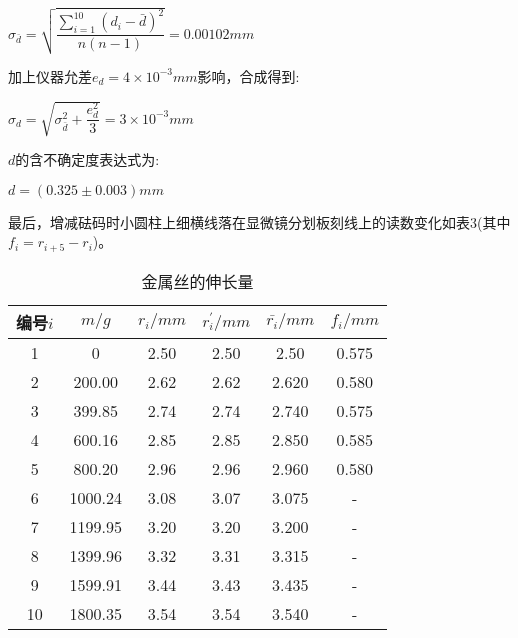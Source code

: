 \documentclass[a4 paper,12pt]{article}
\begin{document}
\begin{center}
	$\sigma_{\bar{d}}=\sqrt{\dfrac{\sum\limits_{i=1}^{10}(d_{i}-\bar{d})^{2}}{n(n-1)}}=0.00102mm$
\end{center}
\par 加上仪器允差$e_{d}=4\times10^{-3}mm$影响，合成得到:
\begin{center}
	$\sigma_{d}=\sqrt{\sigma_{\bar{d}}^{2}+\dfrac{e_{d}^{2}}{3}}=3\times10^{-3}mm$
\end{center}
\par $d$的含不确定度表达式为:
\begin{center}
	$d=(0.325\pm0.003)mm$
\end{center}
\par 最后，增减砝码时小圆柱上细横线落在显微镜分划板刻线上的读数变化如表3(其中$f_{i}=r_{i+5}-r_{i}$)。
\begin{table}[H]
	\caption{金属丝的伸长量}
	\label{金属丝的伸长量}
	\centering
	\begin{tabular}{c|c|c|c|c|c}
		\toprule[0.5mm]
		编号$i$&$m/g$&$r_{i}/mm$&$r_{i}^{\prime}/mm$&$\bar{r_{i}}/mm$&$f_{i}/mm$\\
		\midrule
		1&0&2.50&2.50&2.50&0.575\\
		2&200.00&2.62&2.62&2.620&0.580\\
		3&399.85&2.74&2.74&2.740&0.575\\
		4&600.16&2.85&2.85&2.850&0.585\\
		5&800.20&2.96&2.96&2.960&0.580\\
		6&1000.24&3.08&3.07&3.075&-\\
		7&1199.95&3.20&3.20&3.200&-\\
		8&1399.96&3.32&3.31&3.315&-\\
		9&1599.91&3.44&3.43&3.435&-\\
		10&1800.35&3.54&3.54&3.540&-\\
		\bottomrule[0.5mm]
	\end{tabular}
\end{table}
\end{document}
